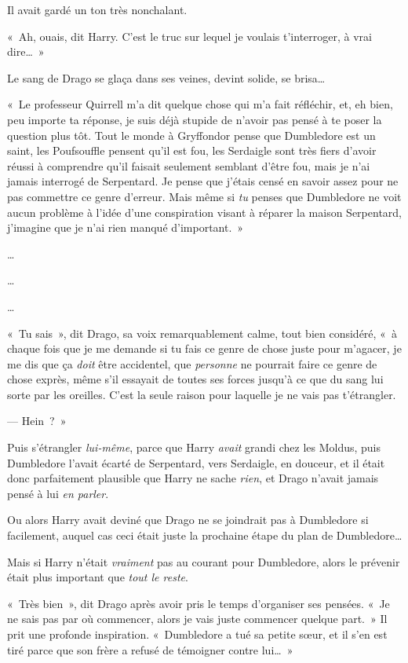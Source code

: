 Il avait gardé un ton très nonchalant.

«~Ah, ouais, dit Harry. C'est le truc sur lequel je voulais t'interroger, à vrai dire…~»

Le sang de Drago se glaça dans ses veines, devint solide, se brisa…

«~Le professeur Quirrell m'a dit quelque chose qui m'a fait réfléchir, et, eh bien, peu importe ta réponse, je suis déjà stupide de n'avoir pas pensé à te poser la question plus tôt. Tout le monde à Gryffondor pense que Dumbledore est un saint, les Poufsouffle pensent qu'il est fou, les Serdaigle sont très fiers d'avoir réussi à comprendre qu'il faisait seulement semblant d'être fou, mais je n'ai jamais interrogé de Serpentard. Je pense que j'étais censé en savoir assez pour ne pas commettre ce genre d'erreur. Mais même si \emph{tu} penses que Dumbledore ne voit aucun problème à l'idée d'une conspiration visant à réparer la maison Serpentard, j'imagine que je n'ai rien manqué d'important.~»

…

…

…

«~Tu sais~», dit Drago, sa voix remarquablement calme, tout bien considéré, «~à chaque fois que je me demande si tu fais ce genre de chose juste pour m'agacer, je me dis que ça \emph{doit} être accidentel, que \emph{personne} ne pourrait faire ce genre de chose exprès, même s'il essayait de toutes ses forces jusqu'à ce que du sang lui sorte par les oreilles. C'est la seule raison pour laquelle je ne vais pas t'étrangler.

--- Hein~?~»

Puis s'étrangler \emph{lui-même}, parce que Harry \emph{avait} grandi chez les Moldus, puis Dumbledore l'avait écarté de Serpentard, vers Serdaigle, en douceur, et il était donc parfaitement plausible que Harry ne sache \emph{rien}, et Drago n'avait jamais pensé à lui \emph{en parler}.

Ou alors Harry avait deviné que Drago ne se joindrait pas à Dumbledore si facilement, auquel cas ceci était juste la prochaine étape du plan de Dumbledore…

Mais si Harry n'était \emph{vraiment} pas au courant pour Dumbledore, alors le prévenir était plus important que \emph{tout le reste}.

«~Très bien~», dit Drago après avoir pris le temps d'organiser ses pensées. «~Je ne sais pas par où commencer, alors je vais juste commencer quelque part.~» Il prit une profonde inspiration. «~Dumbledore a tué sa petite sœur, et il s'en est tiré parce que son frère a refusé de témoigner contre lui…~»

